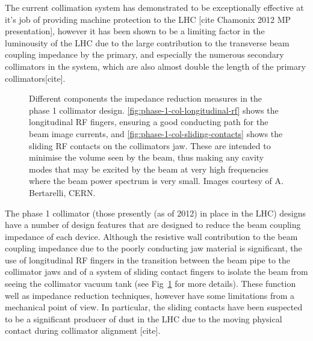 The current collimation system has demonstrated to be exceptionally effective at it's job of providing machine protection to the LHC [cite Chamonix 2012 MP presentation], however it has been shown to be a limiting factor in the luminousity of the LHC due to the large contribution to the transverse beam coupling impedance by the primary, and especially the numerous secondary collimators in the system, which are also almost double the length of the primary collimators[cite]. 

\begin{figure}
\label{fig:phase-1-rf}
\caption{Different components the impedance reduction measures in the phase 1 collimator design. \ref{fig:phase-1-col-longitudinal-rf} shows the longitudinal RF fingers, ensuring a good conducting path for the beam image currents, and \ref{fig:phase-1-col-sliding-contacts} shows the sliding RF contacts on the collimators jaw. These are intended to minimise the volume seen by the beam, thus making any cavity modes that may be excited by the beam at very high frequencies where the beam power spectrum is very small. Images courtesy of A. Bertarelli, CERN.}
\end{figure}

The phase 1 collimator (those presently (as of 2012) in place in the LHC) designs have a number of design features that are designed to reduce the beam coupling impedance of each device. Although the resistive wall contribution to the beam coupling impedance due to the poorly conducting jaw material is significant, the use of longitudinal RF fingers in the transition between the beam pipe to the collimator jaws and of a system of sliding contact fingers to isolate the beam from seeing the collimator vacuum tank (see Fig~\ref{fig:phase-1-rf} for more details). These function well as impedance reduction techniques, however have some limitations from a mechanical point of view. In particular, the sliding contacts have been suspected to be a significant producer of dust in the LHC due to the moving physical contact during collimator alignment [cite]. 

